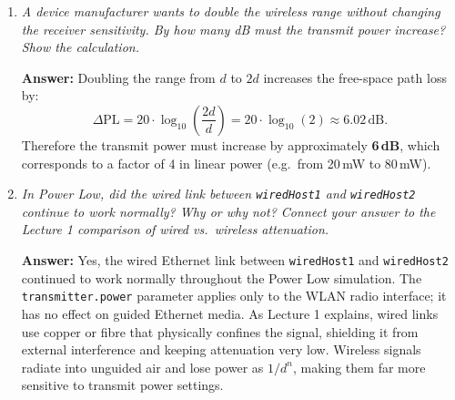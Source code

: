 \documentclass[12pt]{article}
\begin{document}
\begin{enumerate}
    \item \textit{A device manufacturer wants to double the wireless range without
          changing the receiver sensitivity. By how many dB must the transmit power
          increase? Show the calculation.}

    \textbf{Answer:}
    Doubling the range from $d$ to $2d$ increases the free-space path loss by:
    \[
      \Delta\mathrm{PL} = 20\cdot\log_{10}\!\left(\frac{2d}{d}\right)
                        = 20\cdot\log_{10}(2) \approx 6.02\,\text{dB}.
    \]
    Therefore the transmit power must increase by approximately \textbf{6\,dB}, which
    corresponds to a factor of 4 in linear power (e.g.\ from 20\,mW to 80\,mW).

    \item \textit{In Power Low, did the wired link between \texttt{wiredHost1} and
          \texttt{wiredHost2} continue to work normally? Why or why not? Connect your
          answer to the Lecture 1 comparison of wired vs.\ wireless attenuation.}

    \textbf{Answer:}
    Yes, the wired Ethernet link between \texttt{wiredHost1} and \texttt{wiredHost2}
    continued to work normally throughout the Power Low simulation. The
    \texttt{transmitter.power} parameter applies only to the WLAN radio interface; it
    has no effect on guided Ethernet media. As Lecture 1 explains, wired links use
    copper or fibre that physically confines the signal, shielding it from external
    interference and keeping attenuation very low. Wireless signals radiate into
    unguided air and lose power as $1/d^{n}$, making them far more sensitive to
    transmit power settings.

\end{enumerate}
\end{document}

